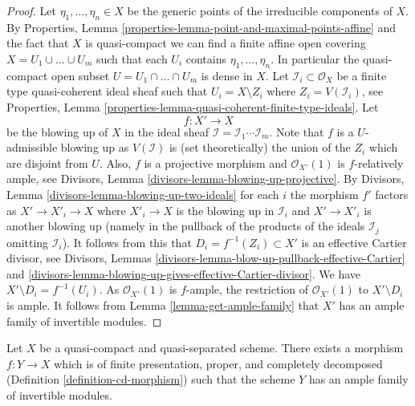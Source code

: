 \begin{proof}
Let $\eta_1, \ldots, \eta_n \in X$ be the generic points of the
irreducible components of $X$. By
Properties, Lemma \ref{properties-lemma-point-and-maximal-points-affine}
and the fact that $X$ is quasi-compact we can find a finite affine
open covering $X = U_1 \cup \ldots \cup U_m$ such that
each $U_i$ contains $\eta_1, \ldots, \eta_n$. In particular
the quasi-compact open subset $U = U_1 \cap \ldots \cap U_m$ is dense in $X$.
Let $\mathcal{I}_i \subset \mathcal{O}_X$ be a finite type quasi-coherent
ideal sheaf such that $U_i = X \setminus Z_i$ where $Z_i = V(\mathcal{I}_i)$,
see Properties, Lemma \ref{properties-lemma-quasi-coherent-finite-type-ideals}.
Let
$$
f : X' \longrightarrow X
$$
be the blowing up of $X$ in the ideal sheaf
$\mathcal{I} = \mathcal{I}_1 \cdots \mathcal{I}_m$.
Note that $f$ is a $U$-admissible blowing up as $V(\mathcal{I})$
is (set theoretically) the union of the $Z_i$ which are disjoint from $U$.
Also, $f$ is a projective morphism and
$\mathcal{O}_{X'}(1)$ is $f$-relatively ample, see
Divisors, Lemma \ref{divisors-lemma-blowing-up-projective}.
By Divisors, Lemma \ref{divisors-lemma-blowing-up-two-ideals}
for each $i$ the morphism $f'$ factors as $X' \to X'_i \to X$
where $X'_i \to X$ is the blowing up in $\mathcal{I}_i$
and $X' \to X'_i$ is another blowing up (namely in the pullback
of the products of the ideals $\mathcal{I}_j$ omitting $\mathcal{I}_i$).
It follows from this that $D_i = f^{-1}(Z_i) \subset X'$ is an effective
Cartier divisor, see
Divisors, Lemmas \ref{divisors-lemma-blow-up-pullback-effective-Cartier} and
\ref{divisors-lemma-blowing-up-gives-effective-Cartier-divisor}.
We have $X' \setminus D_i = f^{-1}(U_i)$. As $\mathcal{O}_{X'}(1)$ is
$f$-ample, the restriction of
$\mathcal{O}_{X'}(1)$ to $X' \setminus D_i$ is ample. It follows from
Lemma \ref{lemma-get-ample-family}
that $X'$ has an ample family of invertible modules.
\end{proof}

\begin{proposition}
\label{proposition-envelope-with-resolution-property}
Let $X$ be a quasi-compact and quasi-separated scheme. There exists a
morphism $f : Y \to X$ which is of finite presentation, proper, and
completely decomposed (Definition \ref{definition-cd-morphism})
such that the scheme $Y$ has an ample family of invertible modules.
\end{proposition}

